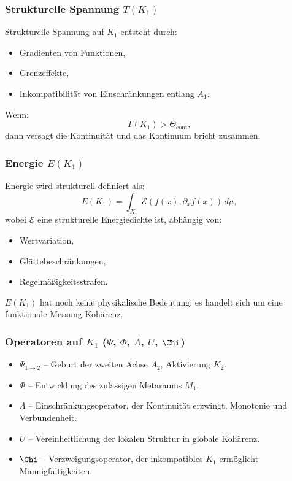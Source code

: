 \subsubsection{Strukturelle Spannung \texorpdfstring{$T(K_1)$}{T(K_1)}}

Strukturelle Spannung auf $K_1$ entsteht durch:
\begin{itemize}
    \item Gradienten von Funktionen,
    \item Grenzeffekte,
    \item Inkompatibilität von Einschränkungen entlang $A_1$.
\end{itemize}

Wenn:
\[
T(K_1) > \Theta_{\mathrm{cont}},
\]
dann versagt die Kontinuität und das Kontinuum bricht zusammen.

\subsubsection{Energie \texorpdfstring{$E(K_1)$}{E(K_1)}}

Energie wird strukturell definiert als:
\[
E(K_1) = \int_X \mathcal{E}(f(x), \partial_x f(x))\, d\mu,
\]
wobei $\mathcal{E}$ eine strukturelle Energiedichte ist, abhängig von:
\begin{itemize}
    \item Wertvariation,
    \item Glättebeschränkungen,
    \item Regelmäßigkeitsstrafen.
\end{itemize}

$E(K_1)$ hat noch keine physikalische Bedeutung; es handelt sich um eine funktionale Messung
Kohärenz.

\subsubsection{Operatoren auf \texorpdfstring{$K_1$}{K_1} (\texorpdfstring{$\Psi$}{\Psi}, \texorpdfstring{$\Phi$}{\Phi}, \texorpdfstring{$\Lambda$}{\Lambda}, \texorpdfstring{$U$}{U}, \texorpdfstring{$\Chi$}{\Chi})}

\begin{itemize}
    \item $\Psi_{1\to2}$ – Geburt der zweiten Achse $A_2$, Aktivierung
          $K_2$.
    \item $\Phi$ – Entwicklung des zulässigen Metaraums $M_1$.
    \item $\Lambda$ – Einschränkungsoperator, der Kontinuität erzwingt,
          Monotonie und Verbundenheit.
    \item $U$ – Vereinheitlichung der lokalen Struktur in globale Kohärenz.
    \item $\Chi$ – Verzweigungsoperator, der inkompatibles $K_1$ ermöglicht
          Mannigfaltigkeiten.
\end{itemize}

